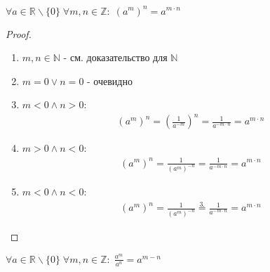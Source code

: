 \break

\begin{theorem}
    $\forall a \in \mathbb{R} \backslash \{0\} \; \forall m, n \in \mathbb{Z}: \; (a^m)^n = a^{m \cdot n}$
\end{theorem}

\begin{proof}
    \hfill

    \begin{enumerate}
        \item $m,n \in \mathbb{N}$ - см. доказательство для $\mathbb{N}$
        \item $m = 0 \lor n = 0$ - очевидно
        \item $m < 0 \land n > 0$:
        \begin{align*}
            (a^m)^n = \left(\frac{1}{a^{-m}}\right)^n = \frac{1}{a^{-m \cdot n}} = a^{m \cdot n}
        \end{align*}
        \item $m > 0 \land n < 0$:
        \begin{align*}
            (a^m)^n = \frac{1}{(a^m)^{-n}} = \frac{1}{a^{-m \cdot n}} = a^{m \cdot n}
        \end{align*}
        \item $m < 0 \land n < 0$:
        \begin{align*}
            (a^m)^n = \frac{1}{(a^m)^{-n}} \stackrel{3.}{=} \frac{1}{a^{-m \cdot n}} = a^{m \cdot n}
        \end{align*}
    \end{enumerate}
\end{proof}

\begin{theorem}
    $\forall a \in \mathbb{R} \backslash \{0\} \; \forall m, n \in \mathbb{Z}: \; \frac{a^m}{a^n} = a^{m-n}$
\end{theorem}


